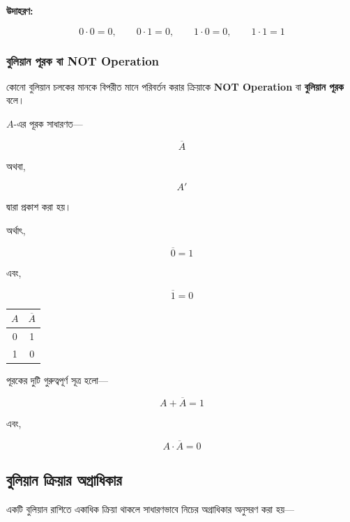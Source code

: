 \textbf{\textcolor{ICTOrange}{উদাহরণ:}}

\[
0\cdot0=0,\qquad
0\cdot1=0,\qquad
1\cdot0=0,\qquad
1\cdot1=1
\]


\subsubsection*{বুলিয়ান পূরক বা \textenglish{NOT Operation}}

কোনো বুলিয়ান চলকের মানকে বিপরীত মানে পরিবর্তন করার ক্রিয়াকে
\textbf{\textenglish{NOT Operation}} বা
\textbf{বুলিয়ান পূরক} বলে।

\(A\)-এর পূরক সাধারণত—

\[
\overline{A}
\]

অথবা,

\[
A'
\]

দ্বারা প্রকাশ করা হয়।

অর্থাৎ,

\[
\overline{0}=1
\]

এবং,

\[
\overline{1}=0
\]

\begin{center}
\begin{tabular}{|c|c|}
\hline
\rowcolor{ICTLightBlue}
\(A\) & \(\overline{A}\) \\
\hline
0 & 1 \\
\hline
1 & 0 \\
\hline
\end{tabular}
\end{center}

পূরকের দুটি গুরুত্বপূর্ণ সূত্র হলো—

\[
A+\overline{A}=1
\]

এবং,

\[
A\cdot\overline{A}=0
\]


\subsection{বুলিয়ান ক্রিয়ার অগ্রাধিকার}

একটি বুলিয়ান রাশিতে একাধিক ক্রিয়া থাকলে সাধারণভাবে
নিচের অগ্রাধিকার অনুসরণ করা হয়—

\par\begingroup

